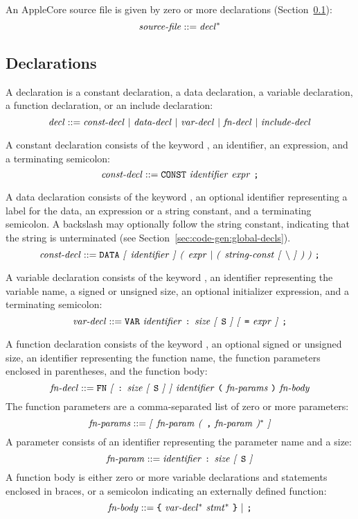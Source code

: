 \documentclass[10pt]{article}
\begin{document}
An AppleCore source file is given by zero or more
declarations (Section~\ref{sec:syntax:decls}):
%
$$\mbox{\textit{source-file}} ::= \mbox{\textit{decl}}^*$$
%

\subsection{Declarations}
\label{sec:syntax:decls}

A declaration is a constant declaration, a data declaration, a
variable declaration, a function declaration, or an include
declaration:
%
$$\mbox{\textit{decl}} ::= \mbox{\ensuremath{\mbox{\textit{const-decl}}} $|$
  \ensuremath{\mbox{\textit{data-decl}}} $|$ \ensuremath{\mbox{\textit{var-decl}}} $|$ \ensuremath{\mbox{\textit{fn-decl}}}
    $|$ \ensuremath{\mbox{\textit{include-decl}}}}$$

 A constant declaration consists of the
keyword , an identifier, an expression, and a terminating
semicolon:
%
$$\mbox{\textit{const-decl}} ::= \mbox{\texttt{CONST} \ensuremath{\mbox{\textit{identifier}}}
  \ensuremath{\mbox{\textit{expr}}} \texttt{;}}$$

 A data declaration consists of the keyword
, an optional identifier representing a label for the data,
an expression or a string constant, and a terminating semicolon.  A
backslash may optionally follow the string constant, indicating that
the string is unterminated (see
Section~\ref{sec:code-gen:global-decls}).
%
$$\nonterm{const-decl} ::= \mbox{\kwd{DATA} \opt{\nonterm{identifier}}
  \group{\nonterm{expr} $|$ \group{\nonterm{string-const} \opt{\bs}}}
  \kwd{;}}$$

 A variable declaration consists of the
keyword , an identifier representing the variable name, a
signed or unsigned size, an optional initializer expression, and a
terminating semicolon:
%
$$\mbox{\textit{var-decl}} ::= \mbox{\texttt{VAR} \ensuremath{\mbox{\textit{identifier}}} \texttt{:}
  \ensuremath{\mbox{\textit{size}}} \textit{[} \texttt{S} \textit{]} \textit{[} \texttt{=} \ensuremath{\mbox{\textit{expr}}} \textit{]} \texttt{;}}$$

 A function declaration consists of the
keyword , an optional signed or unsigned size, an identifier
representing the function name, the function parameters enclosed in
parentheses, and the function body:
%
$$\mbox{\textit{fn-decl}} ::= \mbox{\texttt{FN} \textit{[} \texttt{:} \ensuremath{\mbox{\textit{size}}}
    \textit{[} \texttt{S} \textit{]} \textit{]} \ensuremath{\mbox{\textit{identifier}}} \texttt{(} \ensuremath{\mbox{\textit{fn-params}}}
  \texttt{)} \ensuremath{\mbox{\textit{fn-body}}}}$$
%
The function parameters are a comma-separated list of zero or more
parameters:
%
$$\mbox{\textit{fn-params}} ::= \mbox{\textit{[} \ensuremath{\mbox{\textit{fn-param}}} \textit{(} \texttt{,}
    \ensuremath{\mbox{\textit{fn-param}}} \textit{)}$^*$ \textit{]}}$$
%
A parameter consists of an identifier representing the parameter name
and a size:
%
$$\mbox{\textit{fn-param}} ::= \mbox{\ensuremath{\mbox{\textit{identifier}}} \texttt{:}
  \ensuremath{\mbox{\textit{size}}} \textit{[} \texttt{S} \textit{]}}$$
%
A function body is either zero or more variable declarations and
statements enclosed in braces, or a semicolon indicating an externally
defined function:
%
$$\mbox{\textit{fn-body}} ::= \mbox{\texttt{\{} \ensuremath{\mbox{\textit{var-decl}}}$^*$
  \ensuremath{\mbox{\textit{stmt}}}$^*$ \texttt{\}} $|$ \texttt{;}}$$
\end{document}
